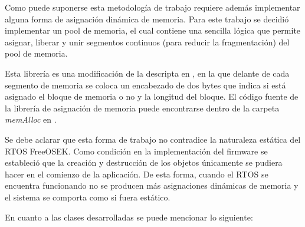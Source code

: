 Como puede suponerse esta metodología de trabajo requiere además implementar alguna forma de asignación dinámica de memoria. Para este trabajo se decidió implementar un pool de memoria, el cual contiene una sencilla lógica que permite asignar, liberar y unir segmentos continuos (para reducir la fragmentación) del pool de memoria. 

Esta librería es una modificación de la descripta en \citep{an_microchip_malloc}, en la que delante de cada segmento de memoria se coloca un encabezado de dos bytes que indica si está asignado el bloque de memoria o no y la longitud del bloque. El código fuente de la librería de asignación de memoria puede encontrarse dentro de la carpeta \textit{memAlloc} en \citep{repo_firmware}.

Se debe aclarar que esta forma de trabajo no contradice la naturaleza estática del RTOS FreeOSEK. Como condición en la implementación del firmware se estableció que la creación y destrucción de los objetos únicamente se pudiera hacer en el comienzo de la aplicación. De esta forma, cuando el RTOS se encuentra funcionando no se producen más asignaciones dinámicas de memoria y el sistema se comporta como si fuera estático.

En cuanto a las clases desarrolladas se puede mencionar lo siguiente:

